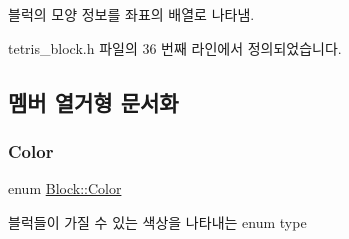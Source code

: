 블럭의 모양 정보를 좌표의 배열로 나타냄. 



tetris\+\_\+block.\+h 파일의 36 번째 라인에서 정의되었습니다.



\subsection{멤버 열거형 문서화}
\mbox{\label{class_block_ad054b4ac51df79aa910040b2a2fdf7b5}} 
\subsubsection{\texorpdfstring{Color}{Color}}
{\footnotesize\ttfamily enum \mbox{\hyperlink{class_block_ad054b4ac51df79aa910040b2a2fdf7b5}{Block\+::\+Color}}\hspace{0.3cm}{\ttfamily [inherited]}}



블럭들이 가질 수 있는 색상을 나타내는 enum type 

